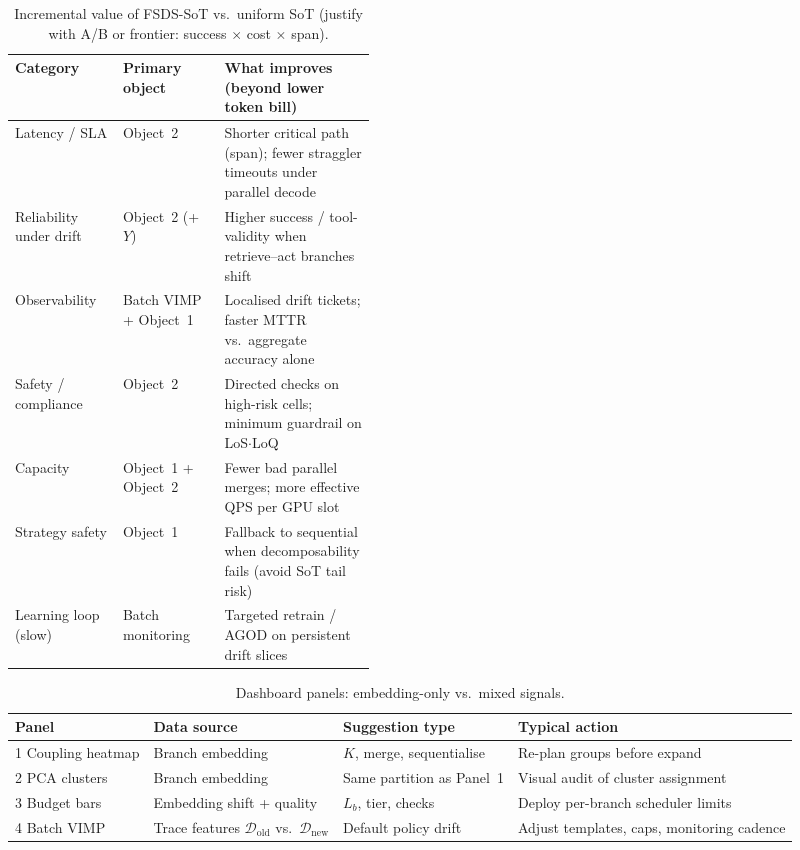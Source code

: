 \documentclass[11pt]{article}
\newcommand{\Dold}{\mathcal{D}_{\mathrm{old}}}
\newcommand{\Dnew}{\mathcal{D}_{\mathrm{new}}}
\newcommand{\VIMP}{\mathrm{VIMP}}
\begin{document}
\begin{table}[t]
\centering
\small
\caption{Incremental value of FSDS-SoT vs.\ uniform SoT (justify with A/B or
frontier: success $\times$ cost $\times$ span).}
\label{tab:incremental-value}
\begin{tabular}{@{}llp{0.42\linewidth}@{}}
\toprule
Category & Primary object & What improves (beyond lower token bill) \\
\midrule
Latency / SLA & Object~2 &
Shorter critical path (span); fewer straggler timeouts under parallel decode \\
Reliability under drift & Object~2 (+ $Y$) &
Higher success / tool-validity when retrieve--act branches shift \\
Observability & Batch $\VIMP$ + Object~1 &
Localised drift tickets; faster MTTR vs.\ aggregate accuracy alone \\
Safety / compliance & Object~2 &
Directed checks on high-risk cells; minimum guardrail on LoS$\cdot$LoQ \\
Capacity & Object~1 + Object~2 &
Fewer bad parallel merges; more effective QPS per GPU slot \\
Strategy safety & Object~1 &
Fallback to sequential when decomposability fails (avoid SoT tail risk) \\
Learning loop (slow) & Batch monitoring &
Targeted retrain / AGOD on persistent drift slices \\
\bottomrule
\end{tabular}
\end{table}

\begin{table}[t]
\centering
\small
\caption{Dashboard panels: embedding-only vs.\ mixed signals.}
\label{tab:dashboard-panels}
\begin{tabular}{@{}llll@{}}
\toprule
Panel & Data source & Suggestion type & Typical action \\
\midrule
1 Coupling heatmap & Branch embedding & $K$, merge, sequentialise &
Re-plan groups before expand \\
2 PCA clusters & Branch embedding & Same partition as Panel~1 &
Visual audit of cluster assignment \\
3 Budget bars & Embedding shift + quality & $L_b$, tier, checks &
Deploy per-branch scheduler limits \\
4 Batch VIMP & Trace features $\Dold$ vs.\ $\Dnew$ & Default policy drift &
Adjust templates, caps, monitoring cadence \\
\bottomrule
\end{tabular}
\end{table}
\end{document}
